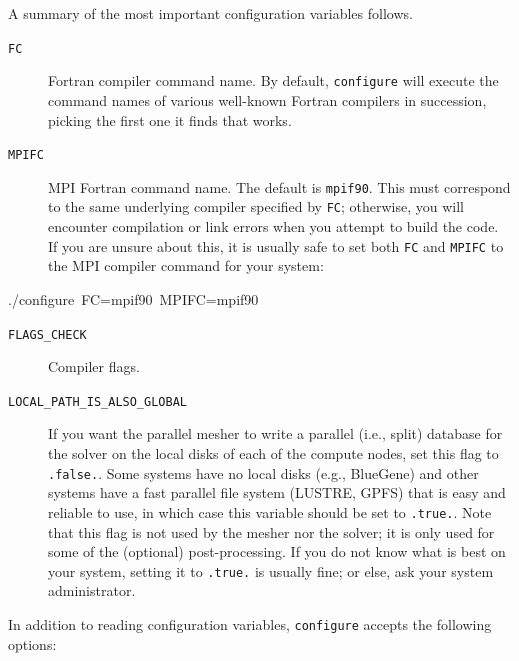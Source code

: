 \documentclass[oneside,english]{book}
\newenvironment{lyxcode}
{\begin{list}{}{
\setlength{\rightmargin}{\leftmargin}
\setlength{\listparindent}{0pt}%
\raggedright
\setlength{\itemsep}{0pt}
\setlength{\parsep}{0pt}
\normalfont\ttfamily}%
 \item[]}
{\end{list}}
\begin{document}
A summary of the most important configuration variables follows.

\begin{description}
\item [{\texttt{FC}}] Fortran compiler command name. By default, \texttt{configure}
will execute the command names of various well-known Fortran compilers
in succession, picking the first one it finds that works.
\item [{\texttt{MPIFC}}] MPI Fortran command name. The default is \texttt{mpif90}.
This must correspond to the same underlying compiler specified by
\texttt{FC}; otherwise, you will encounter compilation or link errors
when you attempt to build the code. If you are unsure about this,
it is usually safe to set both \texttt{FC} and \texttt{MPIFC} to the
MPI compiler command for your system:
\end{description}
\begin{lyxcode}
./configure~FC=mpif90~MPIFC=mpif90
\end{lyxcode}
\begin{description}
\item [{\texttt{FLAGS\_CHECK}}] Compiler flags.
\item [{\texttt{LOCAL\_PATH\_IS\_ALSO\_GLOBAL}}]
If you want the parallel mesher to write a parallel (i.e., split) database for the solver on the
local disks of each of the compute nodes, set this flag to \texttt{.false.}.
Some systems have no local disks
(e.g., BlueGene) and other systems have a fast
parallel file system (LUSTRE, GPFS) that is easy and reliable to use, in which case this variable should be set to
\texttt{.true.}. Note that this flag is not used by the mesher nor
the solver; it is only used for some of the (optional) post-processing.
If you do not know what is best on your system, setting it to \texttt{.true.} is usually fine; or else, ask your system administrator.
\end{description}
In addition to reading configuration variables, \texttt{configure}
accepts the following options:
\end{document}
